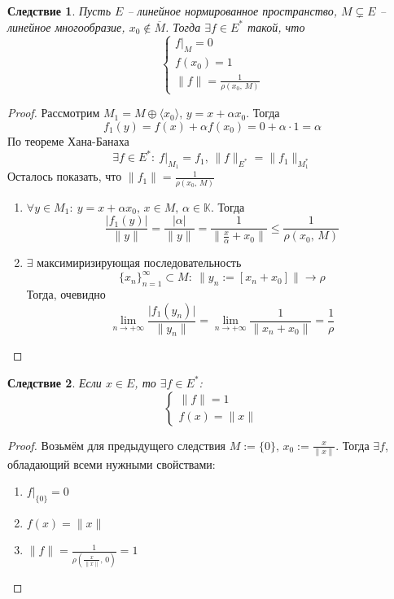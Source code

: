 \documentclass[a4paper,12pt]{article}
\renewcommand{\leq}{\ensuremath{\leqslant}}
\theoremstyle{plain}
\newtheorem*{corollary}{Следствие}
\theoremstyle{definition}
\theoremstyle{remark}
\begin{document}
\begin{corollary}
	Пусть $E$ -- линейное нормированное пространство, $M \subsetneq E$ -- линейное многообразие, $x_0 \not\in \overline{M}$. Тогда $\exists f \in E^*$ такой, что 
	\[
		\begin{cases}
			f|_M = 0\\
			f(x_0) = 1\\
			\|f\| = \frac{1}{\rho(x_0,\, M)}
		\end{cases}
	\]
\end{corollary}

\begin{proof}
	Рассмотрим $M_1 = M \oplus \langle x_0\rangle,\, y = x + \alpha x_0$. Тогда
	\[
		f_1(y) = f(x) + \alpha f(x_0) = 0 + \alpha\cdot 1 = \alpha
	\]
	По теореме Хана-Банаха 
	\[
		\exists f \in E^* :\: f|_{M_1} = f_1,\, \|f\|_{E^*} = \|f_1\|_{M_1^*}
	\]
	Осталось показать, что $\|f_1\| = \frac{1}{\rho(x_0,\, M)}$
	\begin{enumerate}
		\item $\forall y \in M_1 :\: y = x + \alpha x_0,\, x \in M,\, \alpha \in \mathbb{K}$. Тогда 
		\[
			\frac{\vert f_1(y)\vert}{\|y\|} = \frac{\vert \alpha\vert}{\|y\|} = \frac{1}{\|\frac{x}{\alpha} + x_0\|} \leq \frac{1}{\rho(x_0,\, M)}
		\]
		\item $\exists$ максимиризирующая последовательность
		\[
			\{x_n\}_{n = 1}^\infty \subset M :\: \|y_n := [x_n + x_0]\| \to \rho
		\]
		Тогда, очевидно
		\[
			\lim_{n \to +\infty} \frac{\vert f_1(y_n)\vert}{\|y_n\|} = \lim_{n \to +\infty}\frac{1}{\|x_n + x_0\|} = \frac{1}{\rho} 
		\]
	\end{enumerate}
\end{proof}

\begin{corollary}
	Если $x \in E$, то $\exists f \in E^*$:
	\[
		\begin{cases}
			\|f\| = 1\\
			f(x) = \|x\|
		\end{cases}
	\]
\end{corollary}

\begin{proof}
	Возьмём для предыдущего следствия $M := \{0\},\, x_0 := \frac{x}{\|x\|}$. Тогда $\exists f$, обладающий всеми нужными свойствами:
	\begin{enumerate}
		\item $f|_{\{0\}} = 0$
		\item $f(x) = \|x\|$
		\item $\|f\| = \frac{1}{\rho(\frac{x}{\|x\|},\, 0)} = 1$
	\end{enumerate}
\end{proof}
\end{document}
